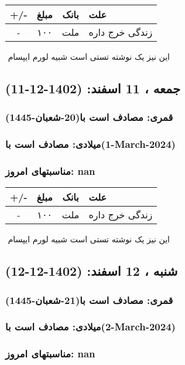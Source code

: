 \documentclass{article}
\newcommand{\rnote}[1]{\marginpar{\textcolor{color}{\StrSubstitute{\##1}{ }{\_}}}}
\newcommand{\myRow}[4]{
    #1 & #2 & #3 & #4 \\ \hline
}
\begin{document}
\begin{tabular}{ | c | c | c | p{5cm} |}
    \hline
    \myRow{ +/- }{مبلغ}{بانک}{علت}
    \myRow{-}{۱۰۰}{ملت}{زندگی خرج داره}
\end{tabular}
\newline
\newline

‌
\rnote{تست}
این نیز یک نوشته تستی است شبیه لورم ایپسام




\newpage
{}
\textcolor{color}{
\section{ جمعه ، 11 اسفند: (1402-12-11) }
\subsubsection*{قمری: مصادف است با(20-شعبان-1445)} 
\subsubsection*{میلادی: مصادف است با(1-March-2024)}
\subsubsection*{مناسبتهای امروز: nan}
}


\begin{tabular}{ | c | c | c | p{5cm} |}
    \hline
    \myRow{ +/- }{مبلغ}{بانک}{علت}
    \myRow{-}{۱۰۰}{ملت}{زندگی خرج داره}
\end{tabular}
\newline
\newline

‌
\rnote{تست}
این نیز یک نوشته تستی است شبیه لورم ایپسام




\newpage
{}
\textcolor{color}{
\section{ شنبه ، 12 اسفند: (1402-12-12) }
\subsubsection*{قمری: مصادف است با(21-شعبان-1445)} 
\subsubsection*{میلادی: مصادف است با(2-March-2024)}
\subsubsection*{مناسبتهای امروز: nan}
}
\end{document}
